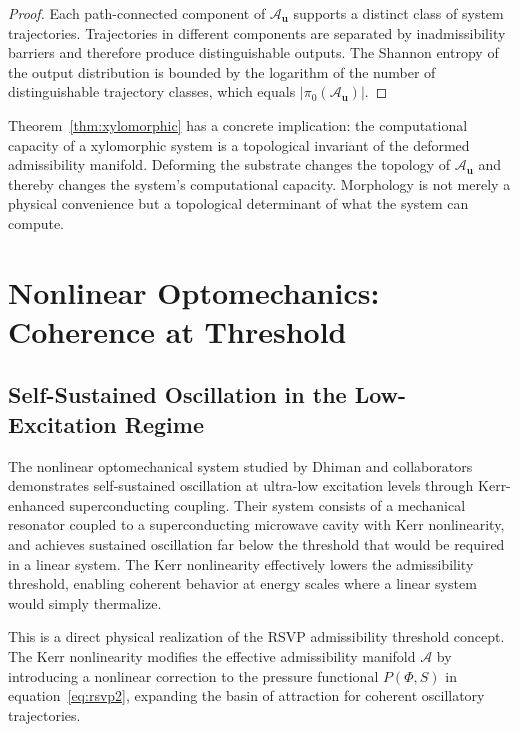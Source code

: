 \documentclass[11pt, oneside]{article}
\numberwithin{equation}{section}
\theoremstyle{rsvpstyle}
\theoremstyle{remark}
\newcommand{\Adm}{\mathcal{A}}
\begin{document}
\begin{proof}
Each path-connected component of $\Adm_\mathbf{u}$ supports a distinct class of
system trajectories. Trajectories in different components are separated by
inadmissibility barriers and therefore produce distinguishable outputs. The
Shannon entropy of the output distribution is bounded by the logarithm of the number
of distinguishable trajectory classes, which equals $|\pi_0(\Adm_\mathbf{u})|$.
\end{proof}

Theorem~\ref{thm:xylomorphic} has a concrete implication: the computational capacity
of a xylomorphic system is a topological invariant of the deformed admissibility
manifold. Deforming the substrate changes the topology of $\Adm_\mathbf{u}$ and
thereby changes the system's computational capacity. Morphology is not merely a physical
convenience but a topological determinant of what the system can compute.

\section{Nonlinear Optomechanics: Coherence at Threshold}
\label{sec:opto}

\subsection{Self-Sustained Oscillation in the Low-Excitation Regime}

The nonlinear optomechanical system studied by Dhiman and collaborators~\cite{Dhiman2026Optomechanics}
demonstrates self-sustained oscillation at ultra-low excitation levels through
Kerr-enhanced superconducting coupling. Their system consists of a mechanical resonator
coupled to a superconducting microwave cavity with Kerr nonlinearity, and achieves
sustained oscillation far below the threshold that would be required in a linear system.
The Kerr nonlinearity effectively lowers the admissibility threshold, enabling coherent
behavior at energy scales where a linear system would simply thermalize.

This is a direct physical realization of the RSVP admissibility threshold concept.
The Kerr nonlinearity modifies the effective admissibility manifold $\Adm$ by introducing
a nonlinear correction to the pressure functional $P(\Phi, S)$ in equation~\eqref{eq:rsvp2},
expanding the basin of attraction for coherent oscillatory trajectories.
\end{document}
